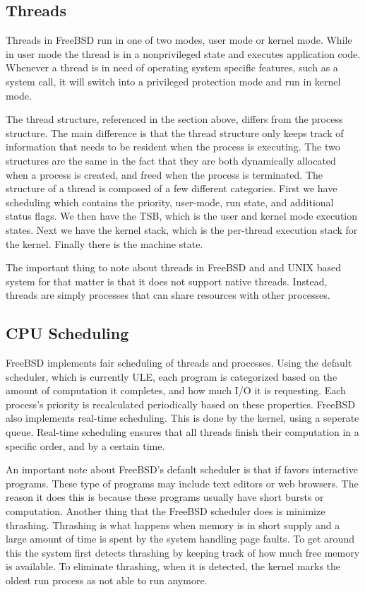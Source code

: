 \documentclass[letterpaper,10pt,titlepage,draftclsnofoot,onecolumn]{IEEEtran}
\begin{document}
\subsection{Threads}
Threads in FreeBSD run in one of two modes, user mode or kernel mode. While in user mode the thread is in a nonprivileged state and executes application code. Whenever a thread is in need of operating system specific features, such as a system call, it will switch into a privileged protection mode and run in kernel mode.

The thread structure, referenced in the section above, differs from the process structure. The main difference is that the thread structure only keeps track of information that needs to be resident when the process is executing. The two structures are the same in the fact that they are both dynamically allocated when a process is created, and freed when the process is terminated. The structure of a thread is composed of a few different categories. First we have scheduling which contains the priority, user-mode, run state, and additional status flags. We then have the TSB, which is the user and kernel mode execution states. Next we have the kernel stack, which is the per-thread execution stack for the kernel. Finally there is the machine state. 

The important thing to note about threads in FreeBSD and and UNIX based system for that matter is that it does not support native threads. Instead, threads are simply processes that can share resources with other processes. 

\subsection{CPU Scheduling}
FreeBSD implements fair scheduling of threads and processes. Using the default scheduler, which is currently ULE, each program is categorized based on the amount of computation it completes, and how much I/O it is requesting. Each process's priority is recalculated periodically based on these properties. FreeBSD also implements real-time scheduling. This is done by the kernel, using a seperate queue. Real-time scheduling ensures that all threads finish their computation in a specific order, and by a certain time. \cite{freebsd}

An important note about FreeBSD's default scheduler is that if favors interactive programs. These type of programs may include text editors or web browsers. The reason it does this is because these programs usually have short bursts or computation. Another thing that the FreeBSD scheduler does is minimize thrashing. Thrashing is what happens when memory is in short supply and a large amount of time is spent by the system handling page faults. To get around this the system first detects thrashing by keeping track of how much free memory is available. To eliminate thrashing, when it is detected, the kernel marks the oldest run process as not able to run anymore.\cite{freebsd}
\end{document}
